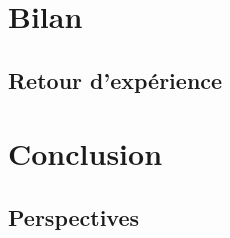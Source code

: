 \documentclass[french, a4paper]{beamer}
\begin{document}
\section{Bilan}
\subsection{Retour d'expérience}


\section{Conclusion}
\subsection{Perspectives}
\end{document}
